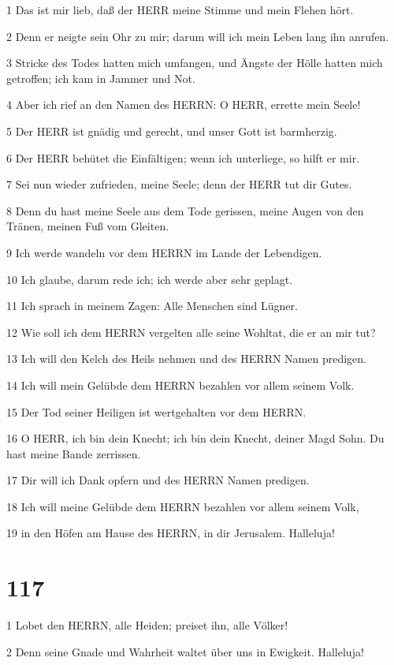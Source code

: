 \par 1 Das ist mir lieb, daß der HERR meine Stimme und mein Flehen hört.
\par 2 Denn er neigte sein Ohr zu mir; darum will ich mein Leben lang ihn anrufen.
\par 3 Stricke des Todes hatten mich umfangen, und Ängste der Hölle hatten mich getroffen; ich kam in Jammer und Not.
\par 4 Aber ich rief an den Namen des HERRN: O HERR, errette mein Seele!
\par 5 Der HERR ist gnädig und gerecht, und unser Gott ist barmherzig.
\par 6 Der HERR behütet die Einfältigen; wenn ich unterliege, so hilft er mir.
\par 7 Sei nun wieder zufrieden, meine Seele; denn der HERR tut dir Gutes.
\par 8 Denn du hast meine Seele aus dem Tode gerissen, meine Augen von den Tränen, meinen Fuß vom Gleiten.
\par 9 Ich werde wandeln vor dem HERRN im Lande der Lebendigen.
\par 10 Ich glaube, darum rede ich; ich werde aber sehr geplagt.
\par 11 Ich sprach in meinem Zagen: Alle Menschen sind Lügner.
\par 12 Wie soll ich dem HERRN vergelten alle seine Wohltat, die er an mir tut?
\par 13 Ich will den Kelch des Heils nehmen und des HERRN Namen predigen.
\par 14 Ich will mein Gelübde dem HERRN bezahlen vor allem seinem Volk.
\par 15 Der Tod seiner Heiligen ist wertgehalten vor dem HERRN.
\par 16 O HERR, ich bin dein Knecht; ich bin dein Knecht, deiner Magd Sohn. Du hast meine Bande zerrissen.
\par 17 Dir will ich Dank opfern und des HERRN Namen predigen.
\par 18 Ich will meine Gelübde dem HERRN bezahlen vor allem seinem Volk,
\par 19 in den Höfen am Hause des HERRN, in dir Jerusalem. Halleluja!

\chapter{117}

\par 1 Lobet den HERRN, alle Heiden; preiset ihn, alle Völker!
\par 2 Denn seine Gnade und Wahrheit waltet über uns in Ewigkeit. Halleluja!

